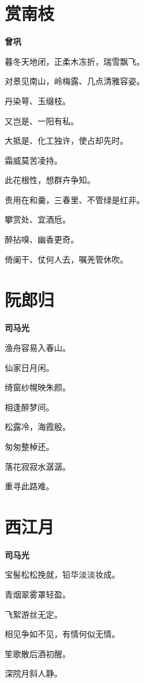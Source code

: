 \documentclass[12pt,a4paper]{ctexbook}
\begin{document}
\section{赏南枝}
\textbf{曾巩}\par\vspace{0.5em}
暮冬天地闭，正柔木冻折，瑞雪飘飞。\par
对景见南山，岭梅露、几点清雅容姿。\par
丹染萼、玉缀枝。\par
又岂是、一阳有私。\par
大抵是、化工独许，使占却先时。\par
霜威莫苦凌持。\par
此花根性，想群卉争知。\par
贵用在和羹，三春里、不管绿是红非。\par
攀赏处、宜酒卮。\par
醉拈嗅、幽香更奇。\par
倚阑干、仗何人去，嘱羌管休吹。\par

\section{阮郎归}
\textbf{司马光}\par\vspace{0.5em}
渔舟容易入春山。\par
仙家日月闲。\par
绮窗纱幌映朱颜。\par
相逢醉梦间。\par
松露冷，海霞殷。\par
匆匆整棹还。\par
落花寂寂水潺潺。\par
重寻此路难。\par

\section{西江月}
\textbf{司马光}\par\vspace{0.5em}
宝髻松松挽就，铅华淡淡妆成。\par
青烟翠雾罩轻盈。\par
飞絮游丝无定。\par
相见争如不见，有情何似无情。\par
笙歌散后酒初醒。\par
深院月斜人静。\par
\end{document}
